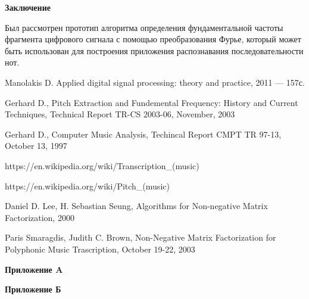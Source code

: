 \documentclass[oneside, final, 14pt]{extarticle}
\begin{document}
\cleardoublepage

{\large \bf Заключение \\}
  Был рассмотрен прототип алгоритма определения фундаментальной частоты фрагмента
  цифрового сигнала с помощью преобразования Фурье, который может быть
  использован для построения приложения распознавания последовательности нот.

\cleardoublepage
{}
\begin{thebibliography}{0}

   Manolakis D. Applied digital signal
    processing: theory and practice, 2011 --- 157с.


   Gerhard D., Pitch Extraction and Fundemental Frequency:
    History and Current Techniques, Technical Report TR-CS 2003-06, November, 2003

   Gerhard D., Computer Music Analysis, Techincal Report CMPT
    TR 97-13, October 13, 1997

   https://en.wikipedia.org/wiki/Transcription\_(music)

   https://en.wikipedia.org/wiki/Pitch\_(music)

   Daniel D. Lee, H. Sebastian Seung,
  Algorithms for Non-negative Matrix Factorization, 2000

   Paris Smaragdis, Judith C. Brown,
    Non-Negative Matrix Factorization
    for Polyphonic Music Trascription, October 19-22, 2003

\end{thebibliography}

\cleardoublepage
\appendix
{\large \bf Приложение A} \\

{\large \bf Приложение Б} \\
\end{document}
